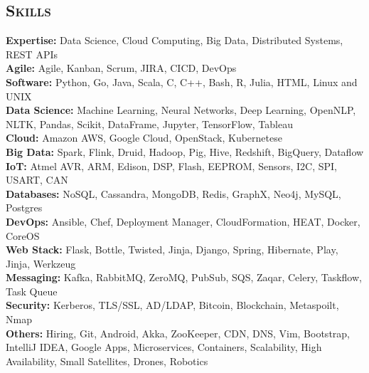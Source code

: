 \begin{resume}
\section{\textsc{Skills}}
{\bf Expertise:} Data Science, Cloud Computing, Big Data, Distributed Systems, REST APIs
\\ {\bf Agile:} Agile, Kanban, Scrum, JIRA, CICD, DevOps
\\ {\bf Software:} Python, Go, Java, Scala, C, C++, Bash, R, Julia, HTML, Linux and UNIX
\\ {\bf Data Science:} Machine Learning, Neural Networks, Deep Learning, OpenNLP, NLTK, Pandas, Scikit, DataFrame, Jupyter, TensorFlow, Tableau
\\ {\bf Cloud:} Amazon AWS, Google Cloud, OpenStack, Kubernetese
\\ {\bf Big Data:} Spark, Flink, Druid, Hadoop, Pig, Hive, Redshift, BigQuery, Dataflow
\\ {\bf IoT:} Atmel AVR, ARM, Edison, DSP, Flash, EEPROM, Sensors, I2C, SPI, USART, CAN
\\ {\bf Databases:} NoSQL, Cassandra, MongoDB, Redis, GraphX, Neo4j, MySQL, Postgres
\\ {\bf DevOps:} Ansible, Chef, Deployment Manager, CloudFormation, HEAT, Docker, CoreOS
\\ {\bf Web Stack:} Flask, Bottle, Twisted, Jinja, Django, Spring, Hibernate, Play, Jinja, Werkzeug
\\ {\bf Messaging:} Kafka, RabbitMQ, ZeroMQ, PubSub, SQS, Zaqar, Celery, Taskflow, Task Queue
\\ {\bf Security:} Kerberos, TLS/SSL, AD/LDAP, Bitcoin, Blockchain, Metaspoilt, Nmap
\\ {\bf Others:} Hiring, Git, Android, Akka, ZooKeeper, CDN, DNS, Vim, Bootstrap, IntelliJ IDEA, Google Apps, Microservices, Containers, Scalability, High Availability, Small Satellites, Drones, Robotics



\end{resume}

